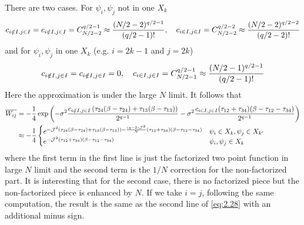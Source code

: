\documentclass[11pt]{article}
\renewcommand{\>}{\rangle}
\newcommand{\<}{\langle}
\begin{document}
There are two cases. For $\psi_{i},\psi_{j}$ not in one $X_{k}$
\begin{equation}
c_{i\notin I,j\in I}=c_{i\notin I,j\in I}=C_{N/2-2}^{q/2-1}\approx\frac{(N/2-2)^{q/2-1}}{(q/2-1)!},\quad c_{i\in I,j\in I}=C_{N/2-2}^{q/2-2}\approx\frac{(N/2-2)^{q/2-2}}{(q/2-2)!}
\end{equation}
and for $\psi_{i},\psi_{j}$ in one $X_{k}$ (e.g. $i=2k-1$ and $j=2k$)
\begin{equation}
c_{i\notin I,j\in I}=c_{i\notin I,j\in I}=0,\quad c_{i\in I,j\in I}=C_{N/2-1}^{q/2-1}\approx\frac{(N/2-1)^{q/2-1}}{(q/2-1)!}
\end{equation}
Here the approximation is under the large $N$ limit. It follows that
\begin{align}
\overline{W_{ij}} & =-\frac{1}{4}\exp\left(-\sigma^{2}\frac{c_{i\notin I,j\in I}\left(\tau_{24}(\beta-\tau_{24})+\tau_{13}(\beta-\tau_{13})\right)}{2^{q-1}}-\sigma^{2}\frac{c_{i\in I,j\in I}(\tau_{12}+\tau_{34})(\beta-\tau_{12}-\tau_{34})}{2^{q-1}}\right)\nonumber \\
 & \approx-\frac{1}{4}\begin{cases}
e^{-\mathcal{J}^{2}\left(\tau_{24}(\beta-\tau_{24})+\tau_{13}(\beta-\tau_{13})\right)-\frac{(q-2)\mathcal{J}^{2}}{N}(\tau_{12}+\tau_{34})(\beta-\tau_{12}-\tau_{34})} & \psi_{i}\in X_{k},\psi_{j}\in X_{k'}\\
e^{-\mathcal{J}^{2}(\tau_{12}+\tau_{34})(\beta-\tau_{12}-\tau_{34})} & \psi_{i},\psi_{j}\in X_{k}
\end{cases} \label{eq:2.28}
\end{align}
where the first term in the first line is just the factorized two
point function in large $N$ limit and the second term is the $1/N$
correction for the non-factorized part. It is interesting that for the second case, there is no factorized piece but the non-factorized piece is enhanced by $N$. If we take $i=j$, following the same computation, the result is the same as the second line of \eqref{eq:2.28} with an additional minus sign.
\end{document}
